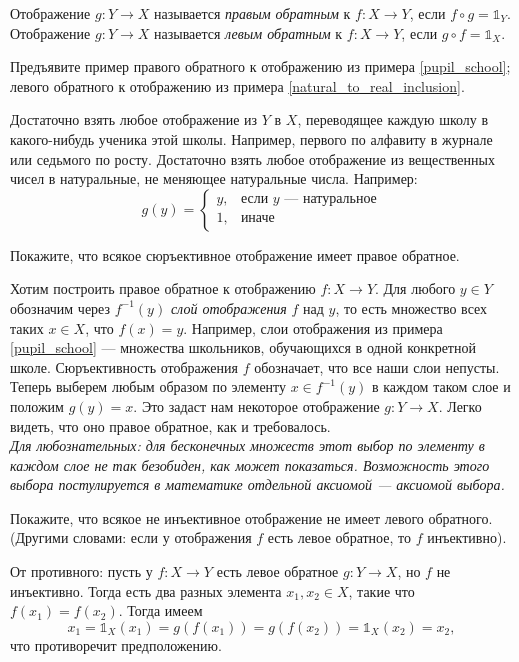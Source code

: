 \documentclass[a4paper,12pt]{article}
\begin{document}
     Отображение $g \colon Y \to X$ называется \emph{правым обратным} к $f \colon X \to Y$, если $f \circ g = \mathds{1}_Y$. Отображение $g \colon Y \to X$ называется \emph{левым обратным} к $f \colon X \to Y$, если $g \circ f = \mathds{1}_X$.
    
    \problem Предъявите пример \sub правого обратного к отображению из примера \ref{pupil_school}; \sub левого обратного к отображению из примера \ref{natural_to_real_inclusion}.
    \begin{solution}
        \sub Достаточно взять любое отображение из $Y$ в $X$, переводящее каждую школу в какого-нибудь ученика этой школы. Например, первого по алфавиту в журнале или седьмого по росту.
        \sub Достаточно взять любое отображение из вещественных чисел в натуральные, не меняющее натуральные числа. Например:
        \begin{equation*}
            g(y) = 
            \begin{cases}
                y, & \text{если $y$ --- натуральное} \\
                1, & \text{иначе}
            \end{cases}
        \end{equation*}
    \end{solution}
    \problem Покажите, что всякое сюръективное отображение имеет правое обратное.
    \begin{solution}
        Хотим построить правое обратное к отображению $f \colon X \to Y$. Для любого $y \in Y$ обозначим через $f^{-1}(y)$ \emph{слой отображения} $f$ над $y$, то есть множество всех таких $x \in X$, что $f(x) = y$. Например, слои отображения из примера \ref{pupil_school} --- множества школьников, обучающихся в одной конкретной школе. Сюръективность отображения $f$ обозначает, что все наши слои непусты. Теперь выберем любым образом по элементу $x \in f^{-1}(y)$ в каждом таком слое и положим $g(y) = x$. Это задаст нам некоторое отображение $g \colon Y \to X$. Легко видеть, что оно правое обратное, как и требовалось. \\
        \textit{Для любознательных: для бесконечных множеств этот выбор по элементу в каждом слое не так безобиден, как может показаться. Возможность этого выбора постулируется в математике отдельной аксиомой --- аксиомой выбора.}
    \end{solution}
    \problem Покажите, что всякое не инъективное отображение не имеет левого обратного. (Другими словами: если у отображения $f$ есть левое обратное, то $f$ инъективно).
    \begin{solution}
        От противного: пусть у $f \colon X \to Y$ есть левое обратное $g \colon Y \to X$, но $f$ не инъективно. Тогда есть два разных элемента $x_1, x_2 \in X$, такие что $f(x_1) = f(x_2)$. Тогда имеем
        \begin{equation*}
            x_1 = \mathds{1}_X(x_1) = g(f(x_1)) = g(f(x_2)) = \mathds{1}_X(x_2) = x_2,
        \end{equation*}
        что противоречит предположению.
    \end{solution}
    
\end{document}

